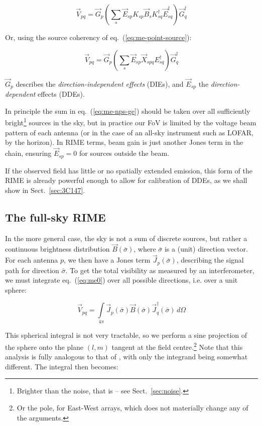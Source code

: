\documentclass[]{aa}
\begin{document}
  \begin{equation}\label{eq:me-nps-gek}
  \vec V_{pq} = \vec G_p \left ( \sum_{s}{\vec E_{sp} K_{sp} \vec B_s K^\dagger_{sq} \vec E^\dagger_{sq}} \right ) \vec G^\dagger_q
  \end{equation}

Or, using the source coherency of eq.~(\ref{eq:me-point-source}):

  \begin{equation}\label{eq:me-nps-ge}
  \vec V_{pq} = \vec G_p \left ( \sum_{s}{\vec E_{sp} \vec X_{spq} E^\dagger_{sq}} \right ) \vec G^\dagger_q
  \end{equation}

$\vec G_p$ describes the {\em direction-independent effects} (DIEs), and $\vec E_{sp}$ the {\em  direction-dependent} effects (DDEs). 

In principle the sum in eq.~(\ref{eq:me-nps-ge}) should be taken over all sufficiently bright\footnote{Brighter than the noise, that is -- see Sect.~\ref{sec:noise}.} sources in the sky, but in practice our FoV is limited by the voltage beam pattern of each antenna (or in the case of an all-sky instrument such as LOFAR, by the horizon). In RIME terms, beam gain is just another Jones term in the chain, ensuring $\vec E_{sp}=0$ for sources outside the beam.

If the observed field has little or no spatially extended emission, this form of the RIME is already powerful enough to allow for calibration of DDEs, as we shall show in Sect.~\ref{sec:3C147}.

\subsection{The full-sky RIME}

In the more general case, the sky is not a sum of discrete sources, but rather a continuous brightness distribution $\vec B(\bar\sigma)$, where $\bar\sigma$ is a (unit) direction vector. For each antenna $p$, we then have a Jones term $\vec J_p(\bar\sigma)$, describing the signal path for direction $\bar\sigma$. To get the total visibility as measured by an interferometer, we must integrate eq.~(\ref{eq:me0}) over all possible directions, i.e. over a unit sphere:

\[
\vec V_{pq} = \int\limits_{4\pi} \vec J_p(\bar\sigma) \vec B(\bar\sigma) \vec J^\dagger_q(\bar\sigma) \, d\Omega
\]

This spherical integral is not very tractable, so we perform a sine projection of the sphere onto the plane $(l,m)$ tangent at the field centre.\footnote{Or the pole, for East-West arrays, which does not materially change any of the arguments.} Note that this analysis is fully analogous to that of \citet[Sect.~3.1]{tms}, with only the integrand being somewhat different. The integral then becomes:
\end{document}
